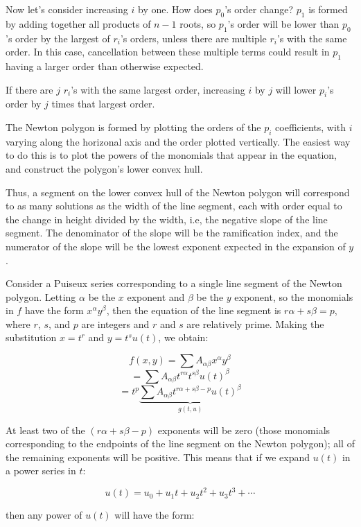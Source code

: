 Now let's consider increasing $i$ by one.  How does $p_0$'s order
change?  $p_1$ is formed by adding together all products of $n-1$
roots, so $p_1$'s order will be lower than $p_0$'s order by the
largest of $r_i$'s orders, unless there are multiple $r_i$'s with the
same order.  In this case, cancellation between these multiple terms
could result in $p_1$ having a larger order than otherwise expected.

If there are $j$ $r_i$'s with the same largest order, increasing $i$
by $j$ will lower $p_i$'s order by $j$ times that largest order.

The Newton polygon is formed by plotting the orders of the $p_i$
coefficients, with $i$ varying along the horizonal axis and the order
plotted vertically.  The easiest way to do this is to plot the powers
of the monomials that appear in the equation, and construct the
polygon's lower convex hull.

Thus, a segment on the lower convex hull of the Newton polygon will
correspond to as many solutions as the width of the line segment, each
with order equal to the change in height divided by the width, i.e,
the negative slope of the line segment.  The denominator of the slope
will be the ramification index, and the numerator of the slope will be
the lowest exponent expected in the expansion of $y$.

Consider a Puiseux series
corresponding to a single line segment of the Newton polygon.
Letting
$\alpha$ be the $x$ exponent and $\beta$ be the $y$ exponent, so the
monomials in $f$ have the form $x^\alpha y^\beta$, then the equation
of the line segment is $r\alpha + s\beta = p$, where $r$, $s$, and $p$
are integers and $r$ and $s$ are relatively prime.  Making the
substitution $x=t^r$ and $y=t^s u(t)$, we obtain:

$$f(x,y) = \sum A_{\alpha\beta} x^\alpha y^\beta$$
$$ = \sum A_{\alpha\beta} t^{r \alpha} t^{s \beta} u(t)^\beta$$
$$ = t^p \underbrace{\sum A_{\alpha\beta} t^{r \alpha + s \beta - p} u(t)^\beta}_{g(t,u)}$$

At least two of the $(r \alpha + s \beta - p)$ exponents will be zero
(those monomials corresponding to the endpoints of the line segment on
the Newton polygon); all of the remaining exponents will be positive.
This means that if we expand $u(t)$ in a power series in $t$:

$$u(t) = u_0 + u_1 t + u_2 t^2 + u_3 t^3 + \cdots$$

then any power of $u(t)$ will have the form:

